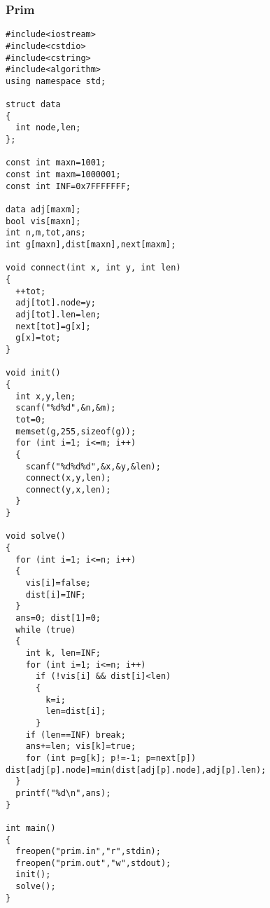 \subsubsection{Prim}
\begin{verbatim}
#include<iostream>
#include<cstdio>
#include<cstring>
#include<algorithm>
using namespace std;

struct data
{
  int node,len;
};

const int maxn=1001;
const int maxm=1000001;
const int INF=0x7FFFFFFF;

data adj[maxm];
bool vis[maxn];
int n,m,tot,ans;
int g[maxn],dist[maxn],next[maxm];

void connect(int x, int y, int len)
{
  ++tot;
  adj[tot].node=y;
  adj[tot].len=len;
  next[tot]=g[x];
  g[x]=tot;
}

void init()
{
  int x,y,len;
  scanf("%d%d",&n,&m);
  tot=0;
  memset(g,255,sizeof(g));
  for (int i=1; i<=m; i++)
  {
    scanf("%d%d%d",&x,&y,&len);
    connect(x,y,len);
    connect(y,x,len);
  }
}

void solve()
{
  for (int i=1; i<=n; i++)
  {
    vis[i]=false;
    dist[i]=INF;
  }
  ans=0; dist[1]=0;
  while (true)
  {
    int k, len=INF;
    for (int i=1; i<=n; i++)
      if (!vis[i] && dist[i]<len)
      {
        k=i;
        len=dist[i];
      }
    if (len==INF) break;
    ans+=len; vis[k]=true;
    for (int p=g[k]; p!=-1; p=next[p]) dist[adj[p].node]=min(dist[adj[p].node],adj[p].len);
  }
  printf("%d\n",ans);
}

int main()
{
  freopen("prim.in","r",stdin);
  freopen("prim.out","w",stdout);
  init();
  solve();
}
\end{verbatim}
